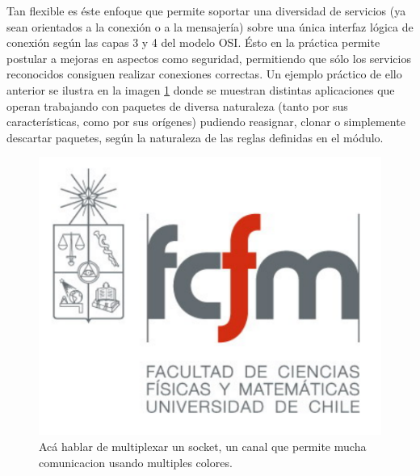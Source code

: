Tan flexible es éste enfoque que permite soportar una diversidad de servicios (ya sean orientados a la conexión o a la mensajería) sobre una única interfaz lógica de conexión según las capas 3 y 4 del modelo OSI. Ésto en la práctica permite postular a mejoras en aspectos como seguridad, permitiendo que sólo los servicios reconocidos consiguen realizar conexiones correctas. Un ejemplo práctico de ello anterior se ilustra en la imagen \ref{fig:multiplexarPuertoEjemplo} donde se muestran distintas aplicaciones que operan trabajando con paquetes de diversa naturaleza (tanto por sus características, como por sus orígenes) pudiendo reasignar, clonar o simplemente descartar paquetes, según la naturaleza de las reglas definidas en el módulo.

\begin{figure}[!h]
	\centering
	\includegraphics[scale=.2]{imagenes/fcfm}
	\caption{Acá hablar de multiplexar un socket, un canal que permite mucha comunicacion usando multiples colores.}
	\label{fig:multiplexarPuertoEjemplo}
\end{figure}